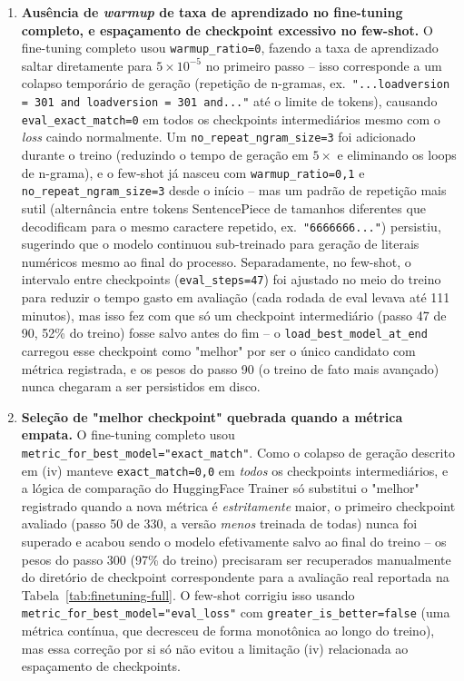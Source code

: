 \begin{enumerate}
\item[(iv)] \textbf{Ausência de \emph{warmup} de taxa de aprendizado no
fine-tuning completo, e espaçamento de checkpoint excessivo no few-shot.}
O fine-tuning completo usou \texttt{warmup\_ratio=0}, fazendo a taxa de
aprendizado saltar diretamente para $5\times10^{-5}$ no primeiro passo --
isso corresponde a um colapso temporário de geração (repetição de
n-gramas, ex.\ \texttt{"...loadversion = 301 and loadversion = 301 and..."}
até o limite de tokens), causando \texttt{eval\_exact\_match=0} em todos os
checkpoints intermediários mesmo com o \emph{loss} caindo normalmente. Um
\texttt{no\_repeat\_ngram\_size=3} foi adicionado durante o treino
(reduzindo o tempo de geração em $5\times$ e eliminando os loops de
n-grama), e o few-shot já nasceu com \texttt{warmup\_ratio=0,1} e
\texttt{no\_repeat\_ngram\_size=3} desde o início -- mas um padrão de
repetição mais sutil (alternância entre tokens SentencePiece de tamanhos
diferentes que decodificam para o mesmo caractere repetido, ex.\
\texttt{"6666666..."}) persistiu, sugerindo que o modelo continuou
sub-treinado para geração de literais numéricos mesmo ao final do processo.
Separadamente, no few-shot, o intervalo entre checkpoints
(\texttt{eval\_steps=47}) foi ajustado no meio do treino para reduzir o
tempo gasto em avaliação (cada rodada de eval levava até 111 minutos), mas
isso fez com que só um checkpoint intermediário (passo 47 de 90, 52\% do
treino) fosse salvo antes do fim -- o \texttt{load\_best\_model\_at\_end}
carregou esse checkpoint como "melhor" por ser o único candidato com
métrica registrada, e os pesos do passo 90 (o treino de fato mais avançado)
nunca chegaram a ser persistidos em disco.

\item[(v)] \textbf{Seleção de "melhor checkpoint" quebrada quando a métrica
empata.} O fine-tuning completo usou
\texttt{metric\_for\_best\_model="exact\_match"}. Como o colapso de geração
descrito em (iv) manteve \texttt{exact\_match=0,0} em \emph{todos} os
checkpoints intermediários, e a lógica de comparação do HuggingFace
Trainer só substitui o "melhor" registrado quando a nova métrica é
\emph{estritamente} maior, o primeiro checkpoint avaliado (passo 50 de
330, a versão \emph{menos} treinada de todas) nunca foi superado e acabou
sendo o modelo efetivamente salvo ao final do treino -- os pesos do passo
300 (97\% do treino) precisaram ser recuperados manualmente do diretório de
checkpoint correspondente para a avaliação real reportada na
Tabela~\ref{tab:finetuning-full}. O few-shot corrigiu isso usando
\texttt{metric\_for\_best\_model="eval\_loss"} com
\texttt{greater\_is\_better=false} (uma métrica contínua, que decresceu de
forma monotônica ao longo do treino), mas essa correção por si só não
evitou a limitação (iv) relacionada ao espaçamento de checkpoints.


\end{enumerate}
